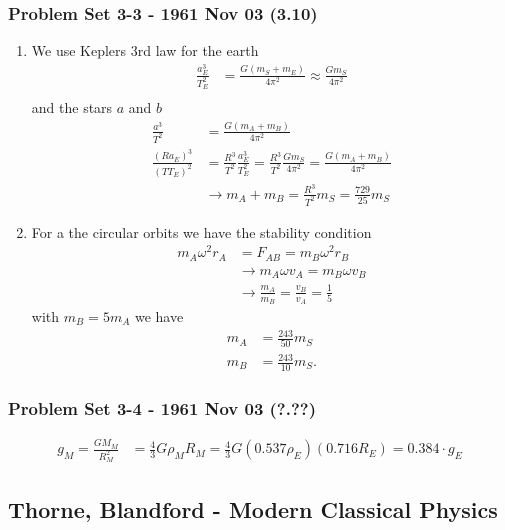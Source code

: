 \documentclass[10pt,a4paper]{article}
\theoremstyle{definition}
\begin{document}
\subsubsection{Problem Set 3-3 - 1961 Nov 03 (3.10)}
\begin{enumerate}[label=(\alph*)]
\item We use Keplers 3rd law for the earth
\begin{align}
    \frac{a_E^3}{T_E^2}&=\frac{G(m_S+m_E)}{4\pi^2}\approx\frac{Gm_S}{4\pi^2}\\
\end{align}
and the stars $a$ and $b$
\begin{align}
    \frac{a^3}{T^2}&=\frac{G(m_A+m_B)}{4\pi^2}\\
    \frac{(Ra_E)^3}{(TT_E)^2}&=\frac{R^3}{T^2}\frac{a_E^3}{T_E^2}=\frac{R^3}{T^2}\frac{Gm_S}{4\pi^2}=\frac{G(m_A+m_B)}{4\pi^2}\\
    &\rightarrow m_A+m_B = \frac{R^3}{T^2}m_S=\frac{729}{25}m_S
\end{align}

\item For a the circular orbits we have the stability condition
\begin{align}
    m_A\omega^2r_A&=F_{AB}=m_B\omega^2r_B\\
    &\rightarrow m_A\omega v_A=m_B\omega v_B\\
    &\rightarrow \frac{m_A}{m_B} =\frac{v_B}{v_A}=\frac{1}{5}
\end{align}
with $m_B=5m_A$ we have 
\begin{align}
    m_A&=\frac{243}{50}m_S\\
    m_B&=\frac{243}{10}m_S.
\end{align}
\end{enumerate}

\subsubsection{Problem Set 3-4 - 1961 Nov 03 (?.??)}
\begin{align}
    g_M=\frac{GM_M}{R_M^2}&=\frac{4}{3}G\rho_M R_M=\frac{4}{3}G (0.537\rho_E) (0.716R_E)=0.384 \cdot g_E
\end{align}


\subsection{{\sc Thorne, Blandford} - Modern Classical Physics}
\end{document}

